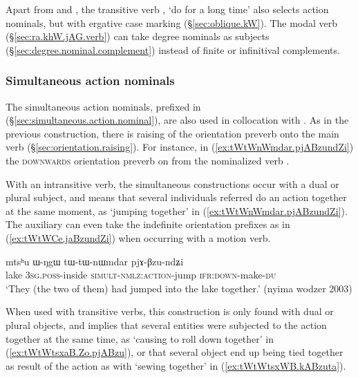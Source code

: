 Apart from  and , the transitive verb , `do for a long time' also selects action nominals, but with ergative case marking (§\ref{sec:oblique.kW}). The modal verb  (§\ref{sec:ra.khW.jAG.verb}) can take degree nominals as subjects (§\ref{sec:degree.nominal.complement}) instead of finite or infinitival complements.


\subsubsection{Simultaneous action nominals} \label{sec:simult.action.nominal.Bzu}
The simultaneous action nominals, prefixed in  (§\ref{sec:simultaneous.action.nominal}), are also used in collocation with .   As in the previous construction, there is raising of the orientation preverb onto the main verb  (§\ref{sec:orientation.raising}). For instance,  in (\ref{ex:tWtWnWmdar.pjABzundZi}) the \textsc{downwards} orientation preverb  on  from the nominalized verb . 

With an intransitive verb, the simultaneous constructions occur with a dual or plural subject, and means that several individuals referred do an action together at the same moment, as  `jumping together' in (\ref{ex:tWtWnWmdar.pjABzundZi}). The auxiliary  can even take the indefinite orientation prefixes   as in (\ref{ex:tWtWCe.jaBzundZi}) when occurring with a motion verb.

\begin{exe}
	\ex \label{ex:tWtWnWmdar.pjABzundZi}
	\gll  mtsʰu ɯ-ŋgɯ tɯ-tɯ-nɯmdar pjɤ-βzu-ndʑi  \\
	lake \textsc{3sg}.\textsc{poss}-inside \textsc{simult}-\textsc{nmlz}:\textsc{action}-jump \textsc{ifr}:\textsc{down}-make-\textsc{du}  \\
	\glt `They (the two of them) had jumped into the lake together.' (nyima wodzer 2003)
\end{exe}

When used with transitive verbs, this construction is only found with dual or plural objects, and implies that several entities were subjected to the action together at the same time, as  `causing to roll down together' in (\ref{ex:tWtWtsxaB.Zo.pjABzu}), or that several object end up being tied together as result of the action as with  `sewing together' in (\ref{ex:tWtWtsxWB.kABzuta}). 


